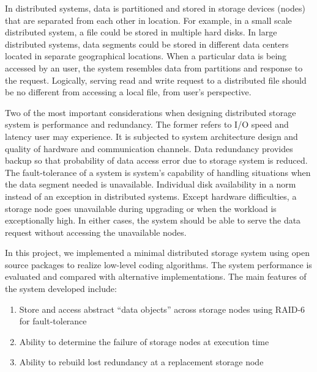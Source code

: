 In distributed systems, data is partitioned and stored in storage devices (nodes) that are separated from each other in location. For example, in a small scale distributed system, a file could be stored in multiple hard disks. In large distributed systems, data segments could be stored in different data centers located in separate geographical locations. When a particular data is being accessed by an user, the system resembles data from partitions and response to the request. Logically, serving read and write request to a distributed file should be no different from accessing a local file, from user's perspective.

Two of the most important considerations when designing distributed storage system is performance and redundancy. The former refers to I/O speed and latency user may experience. It is subjected to system architecture design and quality of hardware and communication channels. Data redundancy provides backup so that probability of data access error due to storage system is reduced. The fault-tolerance of a system is system's capability of handling situations when the data segment needed is unavailable. Individual disk availability in a norm instead of an exception in distributed systems. Except hardware difficulties, a storage node goes unavailable during upgrading or when the workload is exceptionally high. In either cases, the system should be able to serve the data request without accessing the unavailable nodes.

In this project, we implemented a minimal distributed storage system using open source packages to realize low-level coding algorithms. The system performance is evaluated and compared with alternative implementations. The main features of the system developed include: 

\begin{enumerate}
	\item Store and access abstract “data objects” across storage nodes using RAID-6 for fault-tolerance
	
	\item Ability to determine the failure of storage nodes at execution time
	
	\item Ability to rebuild lost redundancy at a replacement storage node
\end{enumerate}



